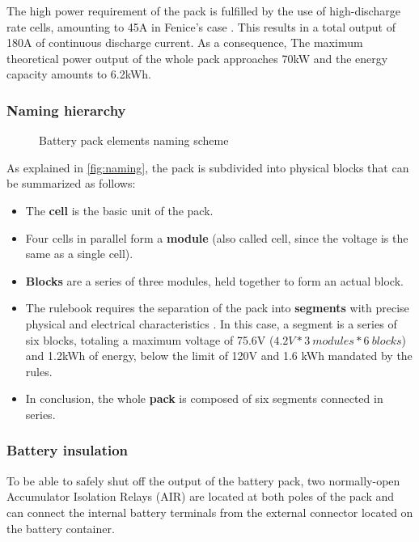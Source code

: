 The high power requirement of the pack is fulfilled by the use of high-discharge rate cells, amounting to 45A in Fenice's case \cite{inr21700-40t}. This results in a total output of 180A of continuous discharge current. As a consequence, The maximum theoretical power output of the whole pack approaches 70kW and the energy capacity amounts to 6.2kWh.

\subsubsection{Naming hierarchy}
\begin{figure}[h]
    \centering
    \resizebox{\textwidth}{!}{%
    }
    \caption{Battery pack elements naming scheme}
    \label{fig:naming}
\end{figure}

As explained in \autoref{fig:naming}, the pack is subdivided into physical blocks that can be summarized as follows:

\begin{itemize}
    \item The \textbf{cell} is the basic unit of the pack.
    \item Four cells in parallel form a \textbf{module} (also called cell, since the voltage is the same as a single cell).
    \item \textbf{Blocks} are a series of three modules, held together to form an actual block.
    \item The rulebook requires the separation of the pack into \textbf{segments} with precise physical and electrical characteristics \cite[EV 5.3.2]{fsg2020}. In this case, a segment is a series of six blocks, totaling a maximum voltage of 75.6V ($4.2V*3\ modules*6\ blocks$) and 1.2kWh of energy, below the limit of 120V and 1.6 kWh mandated by the rules.
    \item In conclusion, the whole \textbf{pack} is composed of six segments connected in series.
\end{itemize}


\subsubsection{Battery insulation}
To be able to safely shut off the output of the battery pack, two normally-open Accumulator Isolation Relays (AIR) \cite[EV 5.6]{fsg2020} are located at both poles of the pack and can connect the internal battery terminals from the external connector located on the battery container.

